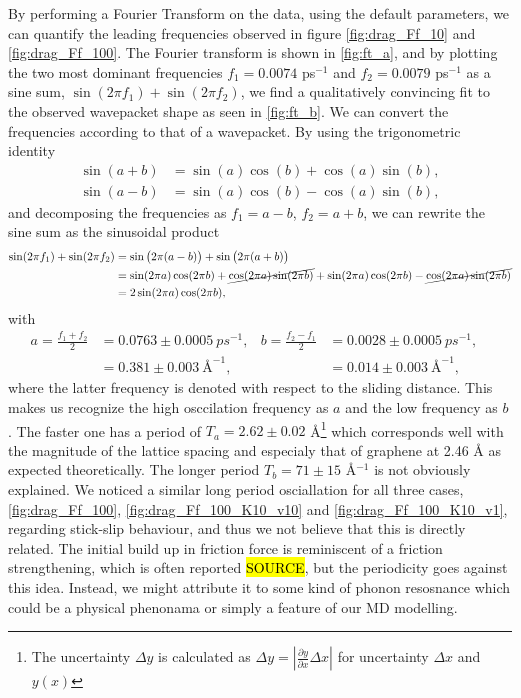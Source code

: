 By performing a Fourier Transform on the data, using the default parameters, we can quantify the leading frequencies observed in figure \cref{fig:drag_Ff_10} and \cref{fig:drag_Ff_100}. The Fourier transform is shown in \cref{fig:ft_a}, and by plotting the two most dominant frequencies $f_1 = 0.0074$ ps$^{-1}$ and $f_2 = 0.0079$ ps$^{-1}$ as a sine sum, $\sin{(2\pi f_1)} + \sin{(2\pi f_2)}$, we find a qualitatively convincing fit to the observed wavepacket shape as seen in \cref{fig:ft_b}. We can convert the frequencies according to that of a wavepacket. By using the trigonometric identity
\begin{align*}
\sin (a+b) &= \sin (a) \cos (b) + \cos (a) \sin (b), \\
\sin (a-b) &= \sin (a) \cos (b) - \cos (a) \sin (b),
\end{align*}
and decomposing the frequencies as $f_1 = a - b$, $f_2 = a + b$, we can rewrite the sine sum as the sinusoidal product
\begin{align*}
  \sin(2\pi f_1) + \sin(2\pi f_2) &= \sin\big(2\pi (a - b)\big) + \sin\big(2\pi (a + b)\big) \\
  &= \sin(2\pi a)\cos(2\pi b) + \cancel{\cos(2\pi a)\sin(2\pi b)} + \sin(2\pi a)\cos(2\pi b) - \cancel{\cos(2\pi a)\sin(2\pi b)} \\
  &= 2 \sin(2\pi a) \cos(2\pi b),
\end{align*} 
with 
\begin{align*}
  a = \frac{f_1 + f_2}{2} &= 0.0763 \pm \SI{0.0005}{ps^{-1}},& 
  b = \frac{f_2 - f_1}{2} &= 0.0028 \pm \SI{0.0005}{ps^{-1}},& \\
  &= 0.381 \pm \SI{0.003}{{\text{Å}}^{-1}},& 
  &= 0.014 \pm \SI{0.003}{{\text{Å}}^{-1}},& 
\end{align*}
where the latter frequency is denoted with respect to the sliding distance. This
makes us recognize the high osccilation frequency as $a$ and the low frequency
as $b$. The faster one has a period of $T_a = 2.62 \pm 0.02$ Å\footnote{The
uncertainty $\Delta y$ is calculated as $\Delta y = \left|\frac{\partial
y}{\partial x} \Delta x \right|$ for uncertainty $\Delta x$ and $y(x)$} which
corresponds well with the magnitude of the lattice spacing and especialy that of
graphene at 2.46 Å as expected theoretically. The longer period $T_b = 71 \pm
15$ Å$^{-1}$ is not obviously explained. We noticed a similar long period osciallation for all three cases, \cref{fig:drag_Ff_100}, \cref{fig:drag_Ff_100_K10_v10} and \cref{fig:drag_Ff_100_K10_v1}, regarding stick-slip behaviour, and thus we not believe that this is directly related. The initial build up in friction force is reminiscent of a friction strengthening, which is often reported \hl{SOURCE}, but the periodicity goes against this idea. Instead, we might attribute it to some kind of phonon
resosnance which could be a physical phenonama or simply a feature of our
\acrshort{MD} modelling. 

